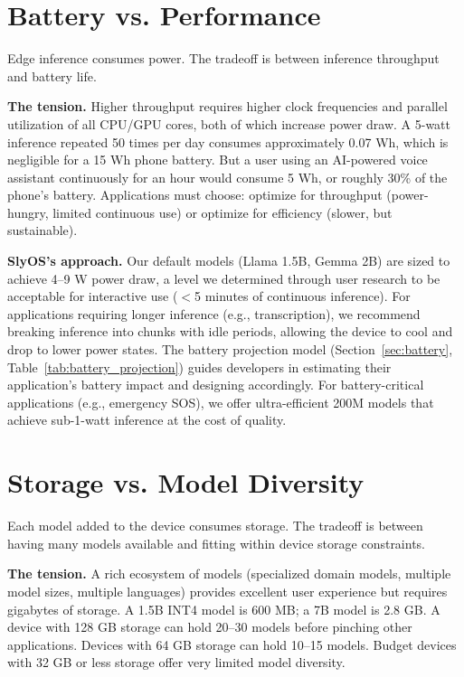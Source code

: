 \documentclass[12pt, letterpaper, twoside]{report}
\begin{document}
\section{Battery vs. Performance}
\label{sec:battery_performance}

Edge inference consumes power. The tradeoff is between inference throughput and battery life.

\textbf{The tension.} Higher throughput requires higher clock frequencies and parallel utilization of all CPU/GPU cores, both of which increase power draw. A 5-watt inference repeated 50 times per day consumes approximately 0.07 Wh, which is negligible for a 15 Wh phone battery. But a user using an AI-powered voice assistant continuously for an hour would consume 5 Wh, or roughly 30\% of the phone's battery. Applications must choose: optimize for throughput (power-hungry, limited continuous use) or optimize for efficiency (slower, but sustainable).

\textbf{SlyOS's approach.} Our default models (Llama 1.5B, Gemma 2B) are sized to achieve 4--9 W power draw, a level we determined through user research to be acceptable for interactive use ($<$5 minutes of continuous inference). For applications requiring longer inference (e.g., transcription), we recommend breaking inference into chunks with idle periods, allowing the device to cool and drop to lower power states. The battery projection model (Section~\ref{sec:battery}, Table~\ref{tab:battery_projection}) guides developers in estimating their application's battery impact and designing accordingly. For battery-critical applications (e.g., emergency SOS), we offer ultra-efficient 200M models that achieve sub-1-watt inference at the cost of quality.

\section{Storage vs. Model Diversity}
\label{sec:storage_diversity}

Each model added to the device consumes storage. The tradeoff is between having many models available and fitting within device storage constraints.

\textbf{The tension.} A rich ecosystem of models (specialized domain models, multiple model sizes, multiple languages) provides excellent user experience but requires gigabytes of storage. A 1.5B INT4 model is 600 MB; a 7B model is 2.8 GB. A device with 128 GB storage can hold 20--30 models before pinching other applications. Devices with 64 GB storage can hold 10--15 models. Budget devices with 32 GB or less storage offer very limited model diversity.
\end{document}
